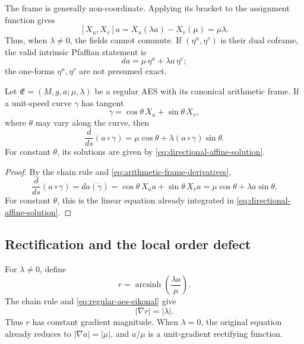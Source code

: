 The frame is generally non-coordinate.  Applying its bracket to the assignment
function gives
\begin{equation}\label{eq:arithmetic-frame-bracket-on-a}
 [X_u,X_v]a
 =X_u(\lambda a)-X_v(\mu)
 =\mu\lambda.
\end{equation}
Thus, when \(\lambda\ne0\), the fields cannot commute.  If
\((\eta^u,\eta^v)\) is their dual coframe, the valid intrinsic Pfaffian statement is
\[
 da=\mu\,\eta^u+\lambda a\,\eta^v;
\]
the one-forms \(\eta^u,\eta^v\) are not presumed exact.

\begin{theorem}\label{thm:continuous-affine-flow}
Let \(\mathfrak E=(M,g,a;\mu,\lambda)\) be a regular AES with its canonical
arithmetic frame.  If a unit-speed curve \(\gamma\) has tangent
\[
 \dot\gamma
 =\cos\theta\,X_u+\sin\theta\,X_v,
\]
where \(\theta\) may vary along the curve, then
\begin{equation}\label{eq:intrinsic-continuous-affine-flow}
 \frac{d}{ds}(a\circ\gamma)
 =\mu\cos\theta+\lambda(a\circ\gamma)\sin\theta.
\end{equation}
For constant \(\theta\), its solutions are given by
\eqref{eq:directional-affine-solution}.
\end{theorem}

\begin{proof}
By the chain rule and \eqref{eq:arithmetic-frame-derivatives},
\[
 \frac{d}{ds}(a\circ\gamma)
 =da(\dot\gamma)
 =\cos\theta\,X_u a+\sin\theta\,X_v a
 =\mu\cos\theta+\lambda a\sin\theta.
\]
For constant \(\theta\), this is the linear equation already integrated in
\eqref{eq:directional-affine-solution}.
\end{proof}

\subsection{Rectification and the local order defect}

For \(\lambda\ne0\), define
\begin{equation}\label{eq:rectifying-assignment}
 r=\operatorname{arcsinh}\!\left(\frac{\lambda a}{\mu}\right).
\end{equation}
The chain rule and \eqref{eq:regular-aes-eikonal} give
\begin{equation}\label{eq:rectified-eikonal}
 |\nabla r|=|\lambda|.
\end{equation}
Thus \(r\) has constant gradient magnitude.  When \(\lambda=0\), the original
equation already reduces to \(|\nabla a|=|\mu|\), and \(a/\mu\) is a
unit-gradient rectifying function.

